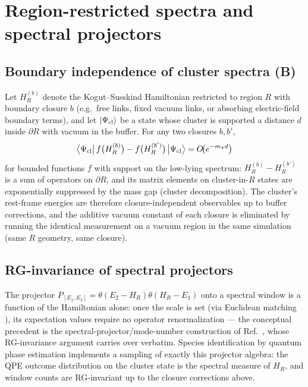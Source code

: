 \section{Region-restricted spectra and spectral projectors}
\label{app:spectral-projectors}

\subsection{Boundary independence of cluster spectra (B)}

Let $H_R^{(b)}$ denote the Kogut--Susskind Hamiltonian restricted to
region $R$ with boundary closure $b$ (e.g.\ free links, fixed vacuum
links, or absorbing electric-field boundary terms), and let
$|\Psi_{\rm cl}\rangle$ be a state whose cluster is supported a distance
$d$ inside $\partial R$ with vacuum in the buffer.  For any two closures
$b,b'$,
\begin{equation}
\big\langle \Psi_{\rm cl}\big|\,f\big(H^{(b)}_R\big)
- f\big(H^{(b')}_R\big)\,\big|\Psi_{\rm cl}\big\rangle
= O\!\big(e^{-m_\pi d}\big)
\end{equation}
for bounded functions $f$ with support on the low-lying spectrum:
$H^{(b)}_R-H^{(b')}_R$ is a sum of operators on $\partial R$, and its
matrix elements on cluster-in-$R$ states are exponentially suppressed by
the mass gap (cluster decomposition).  The cluster's rest-frame energies
are therefore closure-independent observables up to buffer corrections,
and the additive vacuum constant of each closure is eliminated by
running the identical measurement on a vacuum region in the same
simulation (same $R$ geometry, same closure).

\subsection{RG-invariance of spectral projectors}

The projector $P_{[E_1,E_2]}=\theta(E_2-H_R)\theta(H_R-E_1)$ onto a
spectral window is a function of the Hamiltonian alone: once the scale
is set (via Euclidean matching \cite{Carena:2021ltu}), its expectation
values require no operator renormalization --- the conceptual precedent
is the spectral-projector/mode-number construction of
Ref.~\cite{Giusti:2008vb}, whose RG-invariance argument carries over
verbatim.  Species identification by quantum phase estimation
\cite{Kitaev:1995qy,Choi:2020pdg} implements a sampling of exactly this
projector algebra: the QPE outcome distribution on the cluster state is
the spectral measure of $H_R$, and window counts are RG-invariant up to
the closure corrections above.


